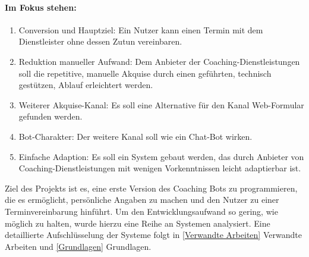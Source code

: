     \paragraph{Im Fokus stehen:}
    \begin{enumerate}
        \item Conversion und Hauptziel: Ein Nutzer kann einen Termin mit dem Dienstleister ohne dessen Zutun vereinbaren.
        \item Reduktion manueller Aufwand: Dem Anbieter der Coaching-Dienstleistungen soll die repetitive, manuelle Akquise durch einen geführten, technisch gestützen, Ablauf erleichtert werden. 
        \item Weiterer Akquise-Kanal: Es soll eine Alternative für den Kanal Web-Formular gefunden werden. 
        \item Bot-Charakter: Der weitere Kanal soll wie ein Chat-Bot wirken.
        \item Einfache Adaption: Es soll ein System gebaut werden, das durch Anbieter von Coaching-Dienstleistungen mit wenigen Vorkenntnissen leicht adaptierbar ist.
    \end{enumerate}
    
    Ziel des Projekts ist es, eine erste Version des Coaching Bots zu programmieren, die es ermöglicht, persönliche Angaben zu machen und den Nutzer zu einer Terminvereinbarung hinführt. Um den Entwicklungsaufwand so gering, wie möglich zu halten, wurde hierzu eine Reihe an Systemen analysiert. Eine detaillierte Aufschlüsselung der Systeme folgt in \ref{Verwandte Arbeiten} Verwandte Arbeiten und \ref{Grundlagen} Grundlagen.




